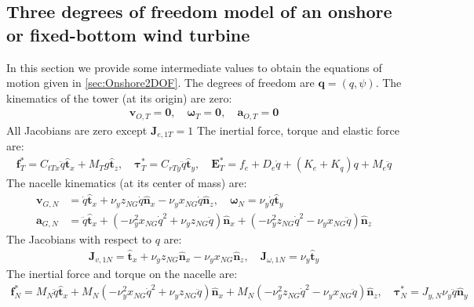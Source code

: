 \documentclass[wes, manuscript]{copernicus}
\renewcommand{\v}[1]{\boldsymbol{#1}}
\begin{document}
\subsection{Three degrees of freedom model of an onshore or fixed-bottom wind turbine}
\label{sec:Onshore2DOFEq}
In this section we provide some intermediate values to obtain the equations of motion given in \autoref{sec:Onshore2DOF}.
    The degrees of freedom are $\v{q}=(q,\psi)$.
The kinematics of the tower (at its origin) are zero:
\begin{align}
\v{v}_{O,T} = \v{0}
, \quad
\v{\omega}_{T} = \v{0}
, \quad
\v{a}_{O,T} = \v{0}
\end{align}
All Jacobians are zero except $\v{J}_{e,1T}=1$
The inertial force, torque and elastic force are:
\begin{align}
\v{f}^*_T = C_{t Tx} \ddot{q}\v{\hat{t}}_x + M_{T} g\v{\hat{t}}_z
    ,\quad
\v{\tau}^*_T =  C_{r Ty} \ddot{q}\v{\hat{t}}_y
    ,\quad
\v{E}_T^*= f_e + D_{e} \dot{q} + (K_{e}+K_q) q + M_{e} \ddot{q}
\end{align}
The nacelle kinematics (at its center of mass) are:
\begin{align}
\v{v}_{G,N} &=  \dot{q}\v{\hat{t}}_x + \nu_y z_{NG} \dot{q}\v{\hat{n}}_x -  \nu_y x_{NG} \dot{q}\v{\hat{n}}_z
,\quad
\v{\omega}_{N} = \nu_y \dot{q}\v{\hat{t}}_y
\\
\v{a}_{G,N} &=  \ddot{q}\v{\hat{t}}_x + (- \nu_y^{2} x_{NG} \dot{q}^{2} + \nu_y z_{NG} \ddot{q})\v{\hat{n}}_x + (- \nu_y^{2} z_{NG} \dot{q}^{2} - \nu_y x_{NG} \ddot{q})\v{\hat{n}}_z
\end{align}
The Jacobians with respect to $q$ are:
\begin{align}
\v{J}_{v,1N}=\v{\hat{t}}_x + \nu_y z_{NG}\v{\hat{n}}_x -  \nu_y x_{NG}\v{\hat{n}}_z
, \quad
\v{J}_{\omega,1N}=\nu_y\v{\hat{t}}_y
\end{align}
The inertial force and torque on the nacelle are:
\begin{align}
\v{f}^*_N = 
M_N  \ddot{q}\v{\hat{t}}_x + M_N \left(- \nu_y^{2} x_{NG} \dot{q}^{2} + \nu_y z_{NG} \ddot{q}\right)\v{\hat{n}}_x + M_N \left(- \nu_y^{2} z_{NG} \dot{q}^{2} - \nu_y x_{NG} \ddot{q}\right)\v{\hat{n}}_z
    ,\quad
\v{\tau}_N^* = 
J_{y,N} \nu_y \ddot{q}\v{\hat{n}}_y
\end{align}
\end{document}
